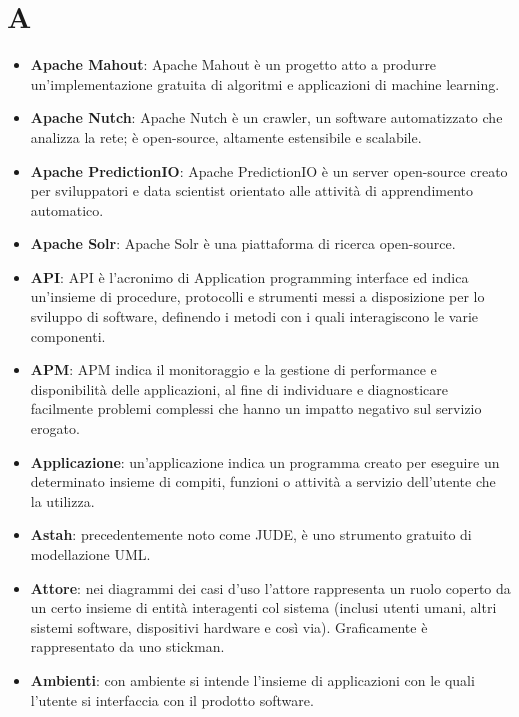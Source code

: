 \documentclass[a4paper, oneside, openany]{article}
\begin{document}
\copertina{}
\tableofcontents
\newpage
\section{A}
\begin{itemize}
\item \textbf{Apache Mahout}: Apache Mahout è un progetto atto a produrre un'implementazione gratuita di algoritmi e applicazioni di machine learning.
\item \textbf{Apache Nutch}: Apache Nutch è un crawler, un software automatizzato che analizza la rete; è open-source, altamente estensibile e scalabile.
\item \textbf{Apache PredictionIO}: Apache PredictionIO è un server open-source creato per sviluppatori e data scientist orientato alle attività di apprendimento automatico.
\item \textbf{Apache Solr}: Apache Solr è una piattaforma di ricerca open-source.
\item \textbf{API}: API è l'acronimo di Application programming interface ed indica un'insieme di procedure, protocolli e strumenti messi a disposizione per lo sviluppo di software, definendo i metodi con i quali interagiscono le varie componenti.
\item \textbf{APM}: APM indica il monitoraggio e la gestione di performance e disponibilità delle applicazioni, al fine di individuare e diagnosticare facilmente problemi complessi che hanno un impatto negativo sul servizio erogato.
\item \textbf{Applicazione}: un'applicazione indica un programma creato per eseguire un determinato insieme di compiti, funzioni o attività a servizio dell'utente che la utilizza.
\item \textbf{Astah}: precedentemente noto come JUDE, è uno strumento gratuito di modellazione UML.
\item \textbf{Attore}: nei diagrammi dei casi d'uso l'attore rappresenta un ruolo coperto da un certo insieme di entità interagenti col sistema (inclusi utenti umani, altri sistemi software, dispositivi hardware e così via). Graficamente è rappresentato da uno stickman.
\item \textbf{Ambienti}: con ambiente si intende l'insieme di applicazioni con le quali l'utente si  interfaccia con il prodotto software.
\end{itemize}
\end{document}
